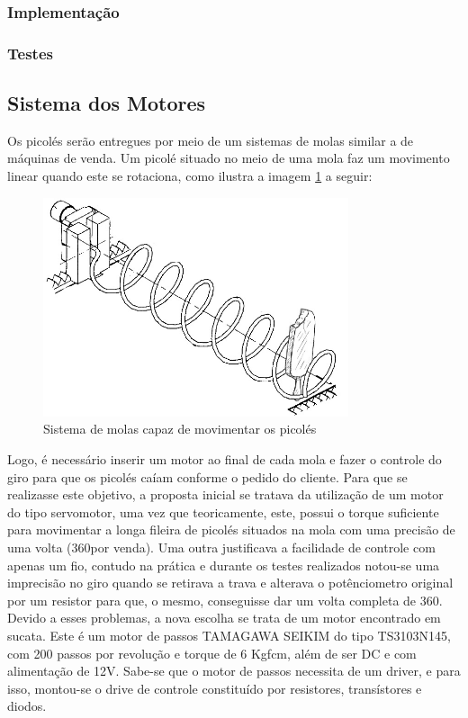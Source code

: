 \subsubsection{Implementação}

\subsubsection{Testes}

\subsection{Sistema dos Motores}
Os picolés serão entregues por meio de um sistemas de molas similar a de máquinas de venda. Um picolé situado no meio de uma mola faz um movimento linear quando este se rotaciona, como ilustra a imagem \ref{fig:sistema_molas} a seguir:

\begin{figure}[H]
	\centering
    \includegraphics[width=0.8\textwidth]{figuras/sistema_molas}
    \caption{Sistema de molas capaz de movimentar os picolés}
    \label{fig:sistema_molas}
\end{figure}

Logo, é necessário inserir um motor ao final de cada mola e fazer o controle do giro para que os picolés caíam conforme o pedido do cliente. Para que se realizasse este objetivo, a proposta inicial se tratava da utilização de um motor do tipo servomotor, uma vez que teoricamente, este, possui o torque suficiente para movimentar a longa fileira de picolés situados na mola com uma precisão de uma volta (360\degree por venda). Uma outra justificava a facilidade de controle com apenas um fio, contudo na prática e durante os testes realizados notou-se uma imprecisão no giro quando se retirava a trava e alterava o potênciometro original por um resistor para que, o mesmo, conseguisse dar um volta completa de 360\degree. Devido a esses problemas, a nova escolha se trata de um motor encontrado em sucata. Este é um motor de passos TAMAGAWA SEIKIM do tipo TS3103N145, com 200 passos por revolução e torque de 6 Kgfcm, além de ser DC e com alimentação de 12V.
Sabe-se que o motor de passos necessita de um driver, e para isso, montou-se o drive de controle constituído por resistores, transístores e diodos.

